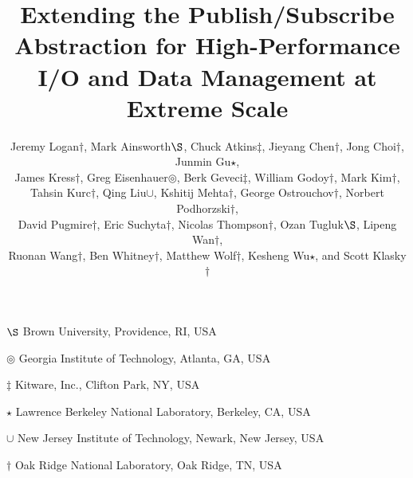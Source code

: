 












\title{Extending the Publish/Subscribe Abstraction for High-Performance I/O and Data Management at Extreme Scale}

\author{
Jeremy Logan$\dagger$,
Mark Ainsworth$\S$,
Chuck Atkins$\ddagger$,
Jieyang Chen$\dagger$,
Jong Choi$\dagger$,
Junmin Gu$\star$, \\
James Kress$\dagger$, 
Greg Eisenhauer$\circledcirc$,
Berk Geveci$\ddagger$,
William Godoy$\dagger$, 
Mark Kim$\dagger$, \\
Tahsin Kurc$\dagger$,
Qing Liu$\cup$, 
Kshitij Mehta$\dagger$, 
George Ostrouchov$\dagger$, 
Norbert Podhorzski$\dagger$, \\
David Pugmire$\dagger$, 
Eric Suchyta$\dagger$, 
Nicolas Thompson$\dagger$, 
Ozan Tugluk$\S$,
Lipeng Wan$\dagger$, \\
Ruonan Wang$\dagger$, 
Ben Whitney$\dagger$,
Matthew Wolf$\dagger$,
Kesheng Wu$\star$,
and Scott Klasky$\dagger$
}
\maketitle

\begin{center}
   {$\S$ \hspace{0em} Brown University, Providence, RI, USA}
   
   {$\circledcirc$ \hspace{0em} Georgia Institute of Technology, Atlanta, GA, USA}
   
   {$\ddagger$ \hspace{0em} Kitware, Inc., Clifton Park, NY, USA}
   
   {$\star$ Lawrence Berkeley National Laboratory, Berkeley, CA, USA}
   
   {$\cup$ \hspace{0em} New Jersey Institute of Technology, Newark, New Jersey, USA}
   
   {$\dagger$ Oak Ridge National Laboratory, Oak Ridge, TN, USA}
\end{center}
\vspace{1.0em}



